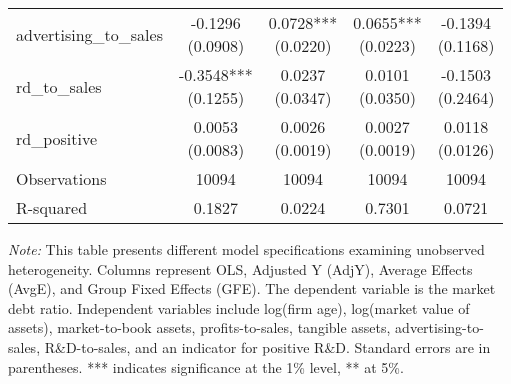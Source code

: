 \documentclass{article}
\begin{document}
\begin{longtable}{@{\extracolsep{\fill}}lcccc}
    advertising\_to\_sales        & \makecell{-0.1296                               \\(0.0908)} & \makecell{0.0728*** \\(0.0220)} & \makecell{0.0655*** \\(0.0223)} & \makecell{-0.1394   \\(0.1168)} \\
    rd\_to\_sales                 & \makecell{-0.3548***                            \\(0.1255)} & \makecell{0.0237    \\(0.0347)} & \makecell{0.0101    \\(0.0350)} & \makecell{-0.1503   \\(0.2464)} \\
    rd\_positive                  & \makecell{0.0053                                \\(0.0083)} & \makecell{0.0026    \\(0.0019)} & \makecell{0.0027    \\(0.0019)} & \makecell{0.0118    \\(0.0126)} \\
    Observations                  & 10094                & 10094  & 10094  & 10094  \\
    R-squared                     & 0.1827               & 0.0224 & 0.7301 & 0.0721 \\
\end{longtable}
{\parbox{\textwidth}{
    \footnotesize
    \textit{Note:} This table presents different model specifications examining unobserved heterogeneity.
    Columns represent OLS, Adjusted Y (AdjY), Average Effects (AvgE), and Group Fixed Effects (GFE).
    The dependent variable is the market debt ratio.
    Independent variables include log(firm age), log(market value of assets), market-to-book assets, profits-to-sales, tangible assets, advertising-to-sales, R\&D-to-sales, and an indicator for positive R\&D.
    Standard errors are in parentheses.
    *** indicates significance at the 1\% level, ** at 5\%.
}}
\end{document}
